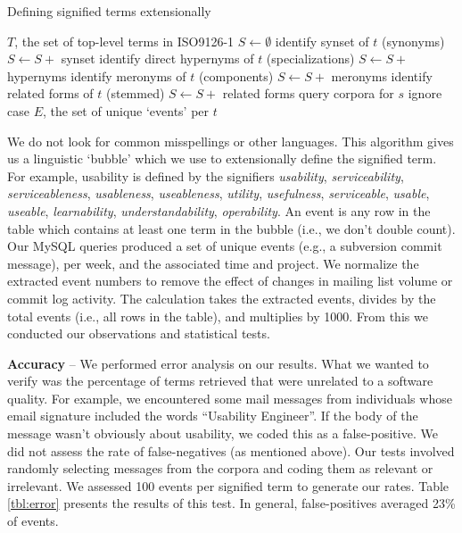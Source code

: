 \documentclass[conference, compsoc]{IEEEtran}
\begin{document}
\renewcommand{\algorithmiccomment}[1]{// #1}
\begin{algorithm}[ht]
\caption{Defining signified terms extensionally}
  \label{alg1}
\begin{algorithmic}
	\REQUIRE $T$, the set of top-level terms in ISO9126-1
	\STATE $S \leftarrow \emptyset $
	\STATE identify synset of $t$ (synonyms)%
	\STATE $S \leftarrow S +$ synset
	\STATE identify direct hypernyms of $t$ (specializations)%
	\STATE $S \leftarrow S +$ hypernyms %
	\STATE identify meronyms of $t$ (components)%
	\STATE $S \leftarrow S +$ meronyms %
	\STATE identify related forms of $t$ (stemmed)%
	\STATE $S \leftarrow S +$ related forms
		\STATE query corpora for $s$
		\COMMENT ignore case
	\ENDFOR
  \ENDFOR
\RETURN $E$, the set of unique `events' per $t$

\end{algorithmic}
\end{algorithm}
We do not look for common misspellings or other languages. This algorithm gives us a linguistic `bubble' which we use to extensionally define the signified term. For example, usability is defined by the signifiers \emph{usability}, \emph{serviceability},  \emph{serviceableness},  \emph{usableness}, \emph{useableness},  \emph{utility},  \emph{usefulness},  \emph{serviceable},  \emph{usable},  \emph{useable},  \emph{learnability},  \emph{understandability},  \emph{operability}. An event is any row in the table which contains at least one term in the bubble (i.e., we don't double count). Our MySQL queries produced a set of unique events (e.g., a subversion commit message), per week, and the associated time and project. We normalize the extracted event numbers to remove the effect of changes in mailing list volume or commit log activity. The calculation takes the extracted events, divides by the total events (i.e., all rows in the table), and multiplies by 1000. From this we conducted our observations and statistical tests.
% 

\noindent\textbf{Accuracy} -- We performed error analysis on our results. What we wanted to verify was the percentage of terms retrieved that were unrelated to a software quality. For example, we encountered some mail messages from individuals whose email signature included the words ``Usability Engineer''. If the body of the message wasn't obviously about usability, we coded this as a false-positive. We did not assess the rate of false-negatives (as mentioned above). Our tests involved randomly selecting messages from the corpora and coding them as relevant or irrelevant. We assessed 100 events per signified term to generate our rates. Table \ref{tbl:error} presents the results of this test. In general, false-positives averaged 23\% of events.
\end{document}
